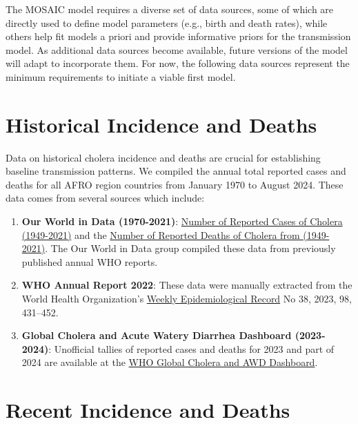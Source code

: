 \documentclass[
]{book}
\providecommand{\tightlist}{%
  \setlength{\itemsep}{0pt}\setlength{\parskip}{0pt}}
\begin{document}
The MOSAIC model requires a diverse set of data sources, some of which are directly used to define model parameters (e.g., birth and death rates), while others help fit models a priori and provide informative priors for the transmission model. As additional data sources become available, future versions of the model will adapt to incorporate them. For now, the following data sources represent the minimum requirements to initiate a viable first model.

\section{Historical Incidence and Deaths}\label{historical-incidence-and-deaths}

Data on historical cholera incidence and deaths are crucial for establishing baseline transmission patterns. We compiled the annual total reported cases and deaths for all AFRO region countries from January 1970 to August 2024. These data comes from several sources which include:

\begin{enumerate}
\def\labelenumi{\arabic{enumi}.}
\tightlist
\item
  \textbf{Our World in Data (1970-2021)}: \href{https://ourworldindata.org/grapher/number-reported-cases-of-cholera}{Number of Reported Cases of Cholera (1949-2021)} and the \href{https://ourworldindata.org/grapher/number-of-reported-cholera-deaths}{Number of Reported Deaths of Cholera from (1949-2021)}. The Our World in Data group compiled these data from previously published annual WHO reports.
\item
  \textbf{WHO Annual Report 2022}: These data were manually extracted from the World Health Organization's \href{https://www.who.int/publications/journals/weekly-epidemiological-record}{Weekly Epidemiological Record} No 38, 2023, 98, 431--452.
\item
  \textbf{Global Cholera and Acute Watery Diarrhea Dashboard (2023-2024)}: Unofficial tallies of reported cases and deaths for 2023 and part of 2024 are available at the \href{https://who-global-cholera-and-awd-dashboard-1-who.hub.arcgis.com/}{WHO Global Cholera and AWD Dashboard}.
\end{enumerate}

\section{Recent Incidence and Deaths}\label{recent-incidence-and-deaths}
\end{document}
